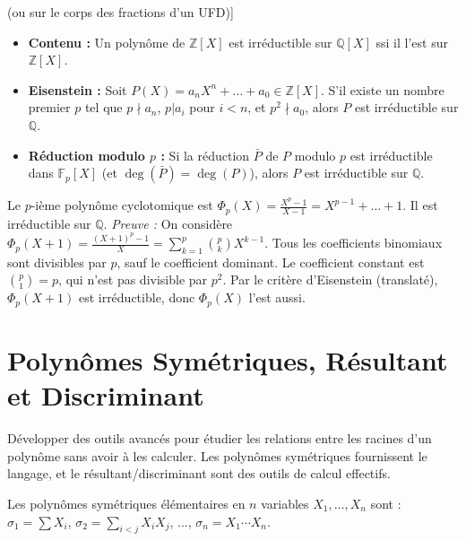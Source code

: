 \begin{theorem}[Critères d'Irréductibilité sur Q[X] (ou sur le corps des fractions d'un UFD)]
    \begin{itemize}
        \item \textbf{Contenu :} Un polynôme de $\mathbb{Z}[X]$ est irréductible sur $\mathbb{Q}[X]$ ssi il l'est sur $\mathbb{Z}[X]$.
        \item \textbf{Eisenstein :} Soit $P(X) = a_n X^n + \dots + a_0 \in \mathbb{Z}[X]$. S'il existe un nombre premier $p$ tel que $p \nmid a_n$, $p | a_i$ pour $i<n$, et $p^2 \nmid a_0$, alors $P$ est irréductible sur $\mathbb{Q}$.
        \item \textbf{Réduction modulo $p$ :} Si la réduction $\bar{P}$ de $P$ modulo $p$ est irréductible dans $\mathbb{F}_p[X]$ (et $\deg(\bar{P})=\deg(P)$), alors $P$ est irréductible sur $\mathbb{Q}$.
    \end{itemize}
\end{theorem}

\begin{application}
    Le $p$-ième polynôme cyclotomique est $\Phi_p(X) = \frac{X^p-1}{X-1} = X^{p-1} + \dots + 1$. Il est irréductible sur $\mathbb{Q}$.
    \textit{Preuve :} On considère $\Phi_p(X+1) = \frac{(X+1)^p-1}{X} = \sum_{k=1}^p \binom{p}{k} X^{k-1}$. Tous les coefficients binomiaux sont divisibles par $p$, sauf le coefficient dominant. Le coefficient constant est $\binom{p}{1}=p$, qui n'est pas divisible par $p^2$. Par le critère d'Eisenstein (translaté), $\Phi_p(X+1)$ est irréductible, donc $\Phi_p(X)$ l'est aussi.
\end{application}

\section{Polynômes Symétriques, Résultant et Discriminant}

\begin{objectif}
    Développer des outils avancés pour étudier les relations entre les racines d'un polynôme sans avoir à les calculer. Les polynômes symétriques fournissent le langage, et le résultant/discriminant sont des outils de calcul effectifs.
\end{objectif}

\begin{definition}
    Les polynômes symétriques élémentaires en $n$ variables $X_1, \dots, X_n$ sont :
    $\sigma_1 = \sum X_i$, $\sigma_2 = \sum_{i<j} X_i X_j$, ..., $\sigma_n = X_1 \cdots X_n$.
\end{definition}


